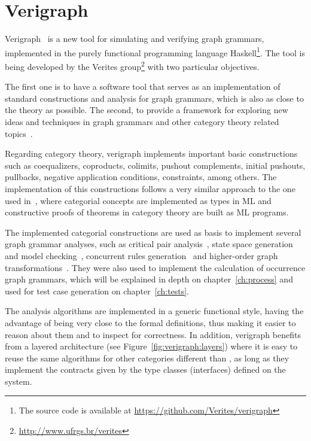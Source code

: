 \chapter{Verigraph}\label{ch:verigraph}

Verigraph~\cite{verigraph} is a new tool for simulating and verifying graph grammars, implemented in the purely functional programming language Haskell\footnote{The source code is available at \url{https://github.com/Verites/verigraph}}. The tool is being developed by the Verites group\footnote{\url{http://www.ufrgs.br/verites}} with two particular objectives. 

  The first one is to have a software tool that serves as an implementation of standard constructions and analysis for graph grammars, which is also as close to the theory as possible. The second, to provide a framework for exploring new ideas and techniques in graph grammars and other category theory related topics~\cite{BezerraETMF2016,Costa2016,CostaETMF2016, Becker2014}.

Regarding category theory, verigraph implements important basic constructions such as coequalizers, coproducts, colimits, pushout complements, initial pushouts, pullbacks, negative application conditions, constraints, among others. The implementation of this constructions follows a very similar approach to the one used in~\cite{Rydeheard1988}, where categorial concepts are implemented as types in ML and constructive proofs of theorems in category theory are built as ML programs.

The implemented categorial constructions are used as basis to implement several graph grammar analyses, such as critical pair analysis~\cite{Lambers2006}, state space generation and model checking~\cite{Becker2014}, concurrent rules generation~\cite{BezerraETMF2016} and higher-order graph transformations~\cite{Machado2015}. They were also used to implement the calculation of occurrence graph grammars, which will be explained in depth on
chapter~\ref{ch:process} and used for test case generation on chapter~\ref{ch:tests}.

The analysis algorithms are implemented in a generic functional style, having the advantage of being very close to the formal definitions, thus making it easier to reason about them and to inspect for correctness. In addition, verigraph benefits from a layered architecture (see Figure~\ref{fig:verigraph:layers}) where it is easy to reuse the same algorithms for other categories different than , as long as they implement the contracts given by the type
classes (interfaces) defined on the system. 

